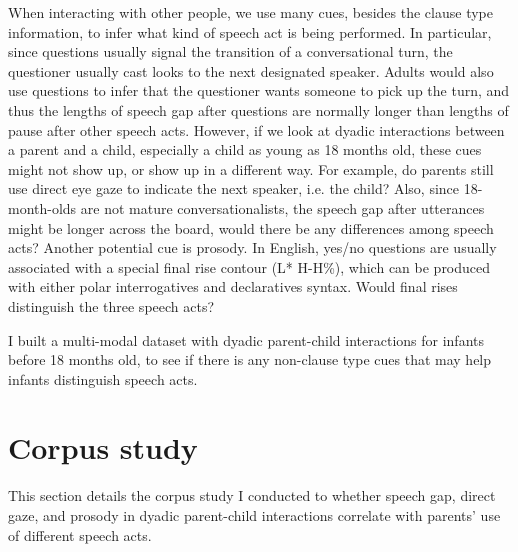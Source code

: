 When interacting with other people, we use many cues, besides the clause type information, to infer what kind of speech act is being performed. In particular, since questions usually signal the transition of a conversational turn, the questioner usually cast looks to the next designated speaker. Adults would also use questions to infer that the questioner wants someone to pick up the turn, and thus the lengths of speech gap after questions are normally longer than lengths of pause after other speech acts. However, if we look at dyadic interactions between a parent and a child, especially a child as young as 18 months old, these cues might not show up, or show up in a different way. For example, do parents still use direct eye gaze to indicate the next speaker, i.e. the child? Also, since 18-month-olds are not mature conversationalists, the speech gap after utterances might be longer across the board, would there be any differences among speech acts? Another potential cue is prosody. In English, yes/no questions are usually associated with a special final rise contour (L* H-H\%), which can be produced with either polar interrogatives and declaratives syntax. Would final rises distinguish the three speech acts?

I built a multi-modal dataset with dyadic parent-child interactions for infants before 18 months old, to see if there is any non-clause type cues that may help infants distinguish speech acts.

\section{Corpus study}
\label{sec:engsp:corpus}

This section details the corpus study I conducted to whether speech gap, direct gaze, and prosody  in dyadic parent-child interactions correlate with parents' use of different speech acts. 


